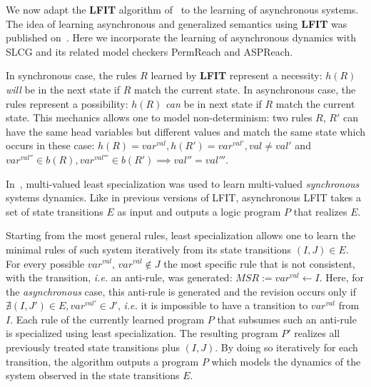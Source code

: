 We now adapt the {\bf LFIT} algorithm of~\cite{ribeiro2015learning} to the learning of asynchronous systems.
The idea of learning asynchronous and generalized semantics using \textbf{LFIT} was published on~\cite{ribeiro2018learning}.
Here we incorporate the learning of asynchronous dynamics with SLCG and its related model checkers PermReach and ASPReach.

In synchronous case, the rules $R$ learned by {\bf LFIT} represent a necessity: $h(R)$ \textit{will} be in the next state if $R$ match the current state.
In asynchronous case, the rules represent a possibility: $h(R)$ \textit{can} be in next state if $R$ match the current state.
This mechanics allows one to model non-determinism: two rules $R$, $R'$ can have the same head variables but different values and match the same state which occurs in these case:
$h(R)=var^{val}, h(R')=var^{val'}, val \neq val'$ and $var^{val''} \in b(R), var^{val'''}\in b(R') \implies val'' = val'''$.

In~\cite{DMTRICLP15}, multi-valued least specialization was used to learn multi-valued \textit{synchronous} systems dynamics.
Like in previous versions of LFIT, asynchronous LFIT takes a set of state transitions $E$ as input and outputs a logic program $P$ that realizes $E$.

Starting from the most general rules, least specialization allows one to learn the minimal rules of such system iteratively from its state transitions $(I,J) \in E$.
For every possible $var^{val}$, $var^{val} \not \in J$ the most specific rule that is not consistent, with the transition, \textit{i.e.} an anti-rule, was generated: $MSR := var^{val} \leftarrow I$.
Here, for the \textit{asynchronous} case, this anti-rule is generated and the revision occurs only if $\nexists (I,J') \in E, var^{val'} \in J'$,
\textit{i.e.} it is impossible to have a transition to $var^{val}$ from $I$.
Each rule of the currently learned program $P$ that subsumes such an anti-rule is specialized using least specialization.
The resulting program $P'$ realizes all previously treated state transitions plus $(I,J)$. %
By doing so iteratively for each transition, the algorithm outputs a program $P$ which models the dynamics of the system observed in the state transitions $E$.

